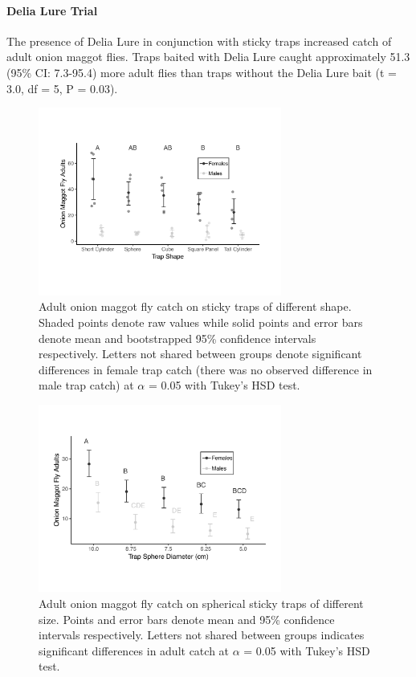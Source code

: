 \documentclass[alpha-refs]{wiley-article}
\begin{document}
\paragraph{Delia Lure Trial} The presence of Delia Lure in conjunction with sticky traps increased catch of adult onion maggot flies.  Traps baited with Delia Lure caught approximately 51.3 (95\% CI: 7.3-95.4) more adult flies than traps without the Delia Lure bait (t = 3.0, df = 5, P = 0.03).




\begin{figure}[bt]
\centering
\includegraphics[width = 8cm]{figures/publication/figure-1.pdf}
\caption{Adult onion maggot fly catch on sticky traps of different shape.  Shaded points denote raw values while solid points and error bars denote mean and bootstrapped 95\% confidence intervals respectively.  Letters not shared between groups denote significant differences in female trap catch (there was no observed difference in male trap catch) at $\alpha$ = 0.05 with Tukey's HSD test. }
\label{fig:figure1}
\end{figure}

\begin{figure}[bt]
\centering
\includegraphics[width = 8cm]{figures/publication/figure-2.pdf}
\caption{Adult onion maggot fly catch on spherical sticky traps of different size.  Points and error bars denote mean and 95\% confidence intervals respectively.  Letters not shared between groups indicates significant differences in adult catch at $\alpha$ = 0.05 with Tukey's HSD test.}
\label{fig:figure2}
\end{figure}
\end{document}
